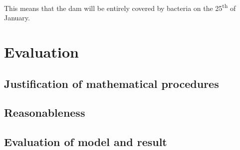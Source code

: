 \documentclass{article}
\theoremstyle{definition}
\begin{document}
        This means that the dam will be entirely covered by bacteria on the 25\textsuperscript{th} of January.

\section{Evaluation}
    
    \subsection{Justification of mathematical procedures}

    \subsection{Reasonableness}

    \subsection{Evaluation of model and result}
\end{document}
